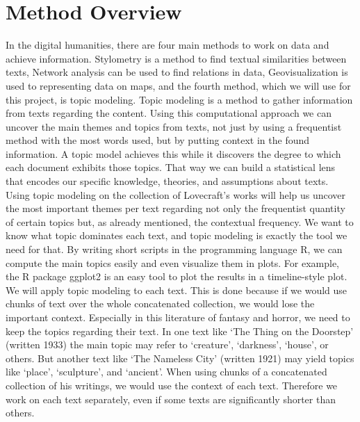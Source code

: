 \section{Method Overview}

In the digital humanities, there are four main methods to work on data and achieve information. 
Stylometry is a method to find textual similarities between texts, Network analysis can be used 
to find relations in data, Geovisualization is used to representing data on maps, and the fourth 
method, which we will use for this project, is topic modeling. Topic modeling is a method to 
gather information from texts regarding the content. Using this computational approach we can 
uncover the main themes and topics from texts, not just by using a frequentist method with the 
most words used, but by putting context in the found information. A topic model achieves this 
while it discovers the degree to which each document exhibits those topics. That way we can 
build a statistical lens that encodes our specific knowledge, theories, and assumptions about 
texts.\\

Using topic modeling on the collection of Lovecraft’s works will help us uncover the most 
important themes per text regarding not only the frequentist quantity of certain topics but, 
as already mentioned, the contextual frequency. We want to know what topic dominates each text, 
and topic modeling is exactly the tool we need for that. By writing short scripts in the 
programming language R, we can compute the main topics easily and even visualize them in plots. 
For example, the R package ggplot2 is an easy tool to plot the results in a timeline-style plot. \\

We will apply topic modeling to each text. This is done because if we would use chunks of text 
over the whole concatenated collection, we would lose the important context. Especially in this 
literature of fantasy and horror, we need to keep the topics regarding their text. In one text 
like ‘The Thing on the Doorstep’ (written 1933) the main topic may refer to ‘creature’, 
‘darkness’, ‘house’, or others. But another text like ‘The Nameless City’ (written 1921) may 
yield topics like ‘place’, ‘sculpture’, and ‘ancient’. When using chunks of a concatenated 
collection of his writings, we would use the context of each text. Therefore we work on each 
text separately, even if some texts are significantly shorter than others.\\


